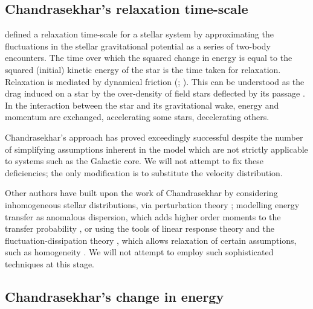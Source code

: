 \documentclass[useAMS,usedcolumn,usegraphicx,usenatbib]{mn2e}
\begin{document}
\begin{onecolumn}

\section{Chandrasekhar's relaxation time-scale}\label{sec:time-scale}

\citet[chapter 2]{Chandrasekhar1960} defined a relaxation time-scale for a stellar system by approximating the fluctuations in the stellar gravitational potential as a series of two-body encounters. The time over which the squared change in energy is equal to the squared (initial) kinetic energy of the star is the time taken for relaxation. Relaxation is mediated by dynamical friction (\citealt{Chandrasekhar1943a}; \citealt[section 1.2]{Binney2008}). This can be understood as the drag induced on a star by the over-density of field stars deflected by its passage \citep{Mulder1983}. In the interaction between the star and its gravitational wake, energy and momentum are exchanged, accelerating some stars, decelerating others.

Chandrasekhar's approach has proved exceedingly successful despite the number of simplifying assumptions inherent in the model which are not strictly applicable to systems such as the Galactic core. We will not attempt to fix these deficiencies; the only modification is to substitute the velocity distribution.

Other authors have built upon the work of Chandrasekhar by considering inhomogeneous stellar distributions, via perturbation theory \citep{Lynden-Bell1972,Tremaine1984,Weinberg1986}; modelling energy transfer as anomalous dispersion, which adds higher order moments to the transfer probability \citep{Bar-Or2012}, or using the tools of linear response theory and the fluctuation-dissipation theory \citep[chapter 7]{Landau1958}, which allows relaxation of certain assumptions, such as homogeneity \citep{Bekenstein1992,Maoz1993,Nelson1999}. We will not attempt to employ such sophisticated techniques at this stage.

\subsection{Chandrasekhar's change in energy}\label{sec:Chandra}


\end{onecolumn}
\end{document}
